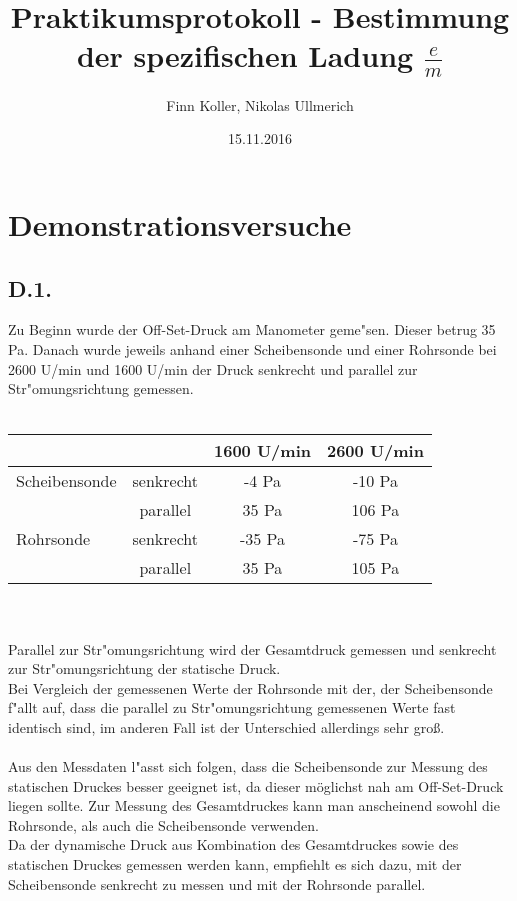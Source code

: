 \documentclass[12pt, a4paper]{article}
\title{\textbf{Praktikumsprotokoll - Bestimmung der spezifischen Ladung $\frac{e}{m}$}}
\author{Finn Koller, Nikolas Ullmerich}
\date{15.11.2016}
\begin{document}
\maketitle
\newpage
\tableofcontents
\newpage

\section{Demonstrationsversuche}
\subsection{D.1.}
Zu Beginn wurde der Off-Set-Druck am Manometer geme"sen. Dieser betrug 35 Pa. Danach wurde jeweils anhand einer Scheibensonde und einer Rohrsonde bei 2600 U/min und 1600 U/min der Druck senkrecht und parallel zur Str"omungsrichtung gemessen. \\
\\
\begin{tabular}{|l||c||c|c|}
\hline
  &   &  1600 U/min & 2600 U/min \\ 
\hline
Scheibensonde & senkrecht & -4 Pa & -10 Pa \\ 
\hline
& parallel & 35 Pa & 106 Pa \\ 
\hline
Rohrsonde & senkrecht & -35 Pa & -75 Pa \\ 
\hline
& parallel & 35 Pa & 105 Pa \\ 
\hline

\end{tabular}
\\
\\
Parallel zur Str"omungsrichtung wird der Gesamtdruck gemessen und senkrecht zur Str"omungsrichtung der statische Druck. \\
Bei Vergleich der gemessenen Werte der Rohrsonde mit der, der Scheibensonde f"allt auf, dass die parallel zu Str"omungsrichtung gemessenen Werte fast identisch sind, im anderen Fall ist der Unterschied allerdings sehr groß.\\
\\
Aus den Messdaten l"asst sich folgen, dass die Scheibensonde zur Messung des statischen Druckes besser geeignet ist, da dieser möglichst nah am Off-Set-Druck liegen sollte. Zur Messung des Gesamtdruckes kann man anscheinend sowohl die Rohrsonde, als auch die Scheibensonde verwenden. \\
Da der dynamische Druck aus Kombination des Gesamtdruckes sowie des statischen Druckes gemessen werden kann, empfiehlt es sich dazu, mit der Scheibensonde senkrecht zu messen und mit der Rohrsonde parallel.
\\
\end{document}
